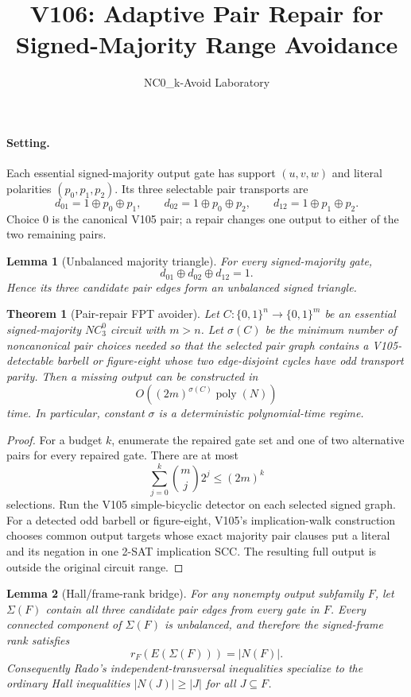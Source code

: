 \documentclass[11pt]{article}
\newtheorem{theorem}{Theorem}
\newtheorem{lemma}{Lemma}
\begin{document}
\title{V106: Adaptive Pair Repair for Signed-Majority Range Avoidance}
\author{NC0\_k-Avoid Laboratory}
\date{}
\maketitle

\paragraph{Setting.}
Each essential signed-majority output gate has support $(u,v,w)$ and literal
polarities $(p_0,p_1,p_2)$.  Its three selectable pair transports are
\[
 d_{01}=1\oplus p_0\oplus p_1,\qquad
 d_{02}=1\oplus p_0\oplus p_2,\qquad
 d_{12}=1\oplus p_1\oplus p_2.
\]
Choice $0$ is the canonical V105 pair; a repair changes one output to either of
the two remaining pairs.

\begin{lemma}[Unbalanced majority triangle]
For every signed-majority gate,
\[
 d_{01}\oplus d_{02}\oplus d_{12}=1.
\]
Hence its three candidate pair edges form an unbalanced signed triangle.
\end{lemma}

\begin{theorem}[Pair-repair FPT avoider]
Let $C:\{0,1\}^n\to\{0,1\}^m$ be an essential signed-majority $NC^0_3$
circuit with $m>n$.  Let $\sigma(C)$ be the minimum number of noncanonical pair
choices needed so that the selected pair graph contains a V105-detectable
barbell or figure-eight whose two edge-disjoint cycles have odd transport
parity.  Then a missing output can be constructed in
\[
 O\!\left((2m)^{\sigma(C)}\operatorname{poly}(N)\right)
\]
time.  In particular, constant $\sigma$ is a deterministic polynomial-time
regime.
\end{theorem}

\begin{proof}
For a budget $k$, enumerate the repaired gate set and one of two alternative
pairs for every repaired gate.  There are at most
\[
 \sum_{j=0}^k {m\choose j}2^j \le (2m)^k
\]
selections.  Run the V105 simple-bicyclic detector on each selected signed graph.
For a detected odd barbell or figure-eight, V105's implication-walk
construction chooses common output targets whose exact majority pair clauses put
a literal and its negation in one 2-SAT implication SCC.  The resulting full
output is outside the original circuit range.
\end{proof}

\begin{lemma}[Hall/frame-rank bridge]
For any nonempty output subfamily $F$, let $\Sigma(F)$ contain all three
candidate pair edges from every gate in $F$.  Every connected component of
$\Sigma(F)$ is unbalanced, and therefore the signed-frame rank satisfies
\[
 r_F(E(\Sigma(F)))=|N(F)|.
\]
Consequently Rado's independent-transversal inequalities specialize to the
ordinary Hall inequalities $|N(J)|\ge |J|$ for all $J\subseteq F$.
\end{lemma}
\end{document}
